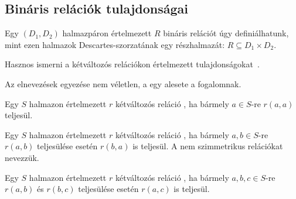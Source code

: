 %
%

\subsection{Bináris relációk tulajdonságai}

Egy $(D_1, D_2)$ halmazpáron értelmezett $R$ bináris relációt úgy definiálhatunk, mint ezen halmazok Descartes-szorzatának egy részhalmazát: $R \subseteq D_1 \times D_2$.

Hasznos ismerni a kétváltozós relációkon értelmezett tulajdonságokat~\cite{wiki:relacio}.

\begin{tipp}
	Az elnevezések egyezése nem véletlen, a  egy alesete a  fogalomnak.
\end{tipp}


\begin{definicio}
	Egy $S$ halmazon értelmezett $r$ kétváltozós reláció , ha bármely $a \in S$-re $r(a, a)$ teljesül.
\end{definicio}

\begin{definicio}
	Egy $S$ halmazon értelmezett $r$ kétváltozós reláció , ha bármely $a,b \in S$-re $r(a, b)$ teljesülése esetén $r(b, a)$ is teljesül. A nem szimmetrikus relációkat  nevezzük.
\end{definicio}

\begin{definicio}
	Egy $S$ halmazon értelmezett $r$ kétváltozós reláció , ha bármely $a,b,c \in S$-re $r(a, b)$ és $r(b, c)$ teljesülése esetén $r(a, c)$ is teljesül.
\end{definicio}

